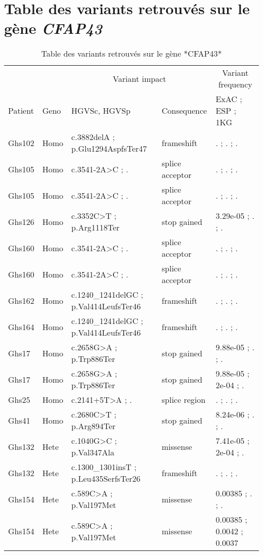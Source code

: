 \documentclass[12pt,twoside]{reedthesis}
\theoremstyle{definition}
\theoremstyle{definition}
\theoremstyle{remark}
\begin{document}
  \newpage
  
  \chapter{\texorpdfstring{Table des variants retrouvés sur le gène
  \emph{CFAP43}}{Table des variants retrouvés sur le gène CFAP43}}\label{table-des-variants-retrouves-sur-le-gene-cfap43}
  
  \begin{landscape}
  \begin{longtable}[t]{lllll}
  \caption{\label{tab:tabcfap43}Table des variants retrouvés sur le gène *CFAP43*}\\
  \toprule
  \multicolumn{2}{c}{ } & \multicolumn{2}{c}{Variant impact} & \multicolumn{1}{c}{Variant frequency} \\
  \cmidrule(l{2pt}r{2pt}){3-4} \cmidrule(l{2pt}r{2pt}){5-5}
  Patient & Geno & HGVSc, HGVSp & Consequence & ExAC ; ESP ; 1KG\\
  \midrule
  Ghs102 & Homo & c.3882delA ; p.Glu1294AspfsTer47 & frameshift & . ; . ; .\\
  Ghs105 & Homo & c.3541-2A>C ; . & splice acceptor & . ; . ; .\\
  Ghs105 & Homo & c.3541-2A>C ; . & splice acceptor & . ; . ; .\\
  Ghs126 & Homo & c.3352C>T ; p.Arg1118Ter & stop gained & 3.29e-05 ; . ; .\\
  Ghs160 & Homo & c.3541-2A>C ; . & splice acceptor & . ; . ; .\\
  \addlinespace
  Ghs160 & Homo & c.3541-2A>C ; . & splice acceptor & . ; . ; .\\
  Ghs162 & Homo & c.1240\_1241delGC ; p.Val414LeufsTer46 & frameshift & . ; . ; .\\
  Ghs164 & Homo & c.1240\_1241delGC ; p.Val414LeufsTer46 & frameshift & . ; . ; .\\
  Ghs17 & Homo & c.2658G>A ; p.Trp886Ter & stop gained & 9.88e-05 ; . ; .\\
  Ghs17 & Homo & c.2658G>A ; p.Trp886Ter & stop gained & 9.88e-05 ; 2e-04 ; .\\
  \addlinespace
  Ghs25 & Homo & c.2141+5T>A ; . & splice region & . ; . ; .\\
  Ghs41 & Homo & c.2680C>T ; p.Arg894Ter & stop gained & 8.24e-06 ; . ; .\\
  Ghs132 & Hete & c.1040G>C ; p.Val347Ala & missense & 7.41e-05 ; 2e-04 ; .\\
  Ghs132 & Hete & c.1300\_1301insT ; p.Leu435SerfsTer26 & frameshift & . ; . ; .\\
  Ghs154 & Hete & c.589C>A ; p.Val197Met & missense & 0.00385 ; . ; .\\
  Ghs154 & Hete & c.589C>A ; p.Val197Met & missense & 0.00385 ; 0.0042 ; 0.0037\\
  \bottomrule
  \end{longtable}
  \end{landscape}
  
\end{document}
